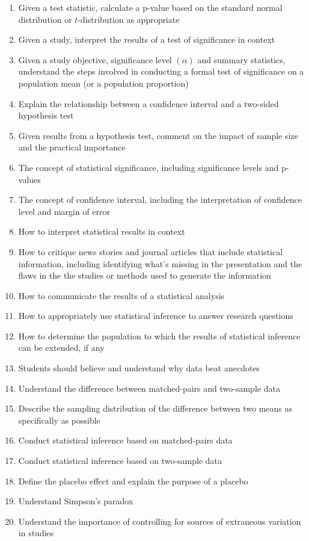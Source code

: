 \documentclass{article}
\begin{document}
\begin{enumerate}
\item Given a test statistic, calculate a p-value based on the standard normal distribution or $t$-distribution as appropriate
\item Given a study, interpret the results of a test of significance in context
\item Given a study objective, significance level $(\alpha)$ and summary statistics, understand the steps involved in conducting a formal test of significance on a population mean (or a population proportion)
\item Explain the relationship between a confidence interval and a two-sided hypothesis test
\item Given results from a hypothesis test, comment on the impact of sample size and the practical importance
\item The concept of statistical significance, including significance levels and p-values
\item The concept of confidence interval, including the interpretation of confidence level and margin of error
\item How to interpret statistical results in context
\item How to critique news stories and journal articles that include statistical information, including identifying what's missing in the presentation and the flaws in the the studies or methods used to generate the information
\item How to communicate the results of a statistical analysis
\item How to appropriately use statistical inference to answer research questions
\item How to determine the population to which the results of statistical inference can be extended, if any
\item Students should believe and understand why data beat anecdotes
\item Understand the difference between matched-pairs and two-sample data
\item Describe the sampling distribution of the difference between two means as specifically as possible
\item Conduct statistical inference based on matched-pairs data
\item Conduct statistical inference based on two-sample data
\item Define the placebo effect and explain the purpose of a placebo
\item Understand Simpson's paradox
\item Understand the importance of controlling for sources of extraneous variation in studies

\end{enumerate}
\end{document}
